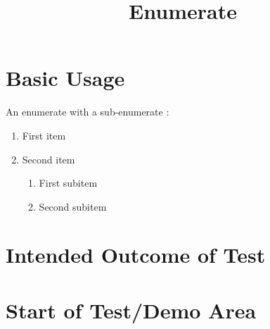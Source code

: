 \documentclass{ximera}
\title{Enumerate}
\begin{document}
\begin{abstract}
\end{abstract}
\maketitle

\section{Basic Usage}

An enumerate with a sub-enumerate :

\begin{enumerate}
    \item First item
    \item Second item
    \begin{enumerate}
        \item First subitem
        \item Second subitem
    \end{enumerate}
\end{enumerate}

\section{Intended Outcome of Test}

\section{Start of Test/Demo Area}
\end{document}
